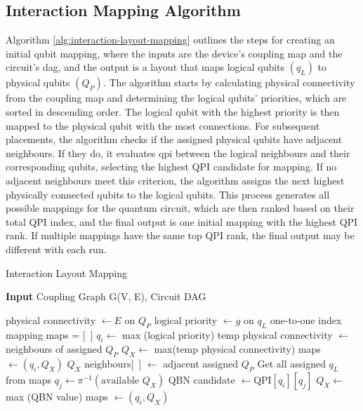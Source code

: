 \subsection{Interaction Mapping Algorithm}
Algorithm \ref{alg:interaction-layout-mapping}  outlines the steps for creating an initial qubit mapping, where the inputs are the device's coupling map and the circuit's \acrfull{dag}, and the output is a layout that maps logical qubits $(q_L)$ to physical qubits $(Q_P)$. The algorithm starts by calculating physical connectivity from the coupling map and determining the logical qubits' priorities, which are sorted in descending order. The logical qubit with the highest priority is then mapped to the physical qubit with the most connections. For subsequent placements, the algorithm checks if the assigned physical qubits have adjacent neighbours. If they do, it evaluates \acrfull{qpi} between the logical neighbours and their corresponding qubits, selecting the highest QPI candidate for mapping. If no adjacent neighbours meet this criterion, the algorithm assigns the next highest physically connected qubits to the logical qubits. This process generates all possible mappings for the quantum circuit, which are then ranked based on their total QPI index, and the final output is one initial mapping with the highest QPI rank. If multiple mappings have the same top QPI rank, the final output may be different with each run.

\begin{algorithm}[htb]
\caption{Interaction Layout Mapping}\label{alg:interaction-layout-mapping}
\hspace*{\algorithmicindent} \textbf{Input} Coupling Graph G(V, E), Circuit DAG \\
\begin{algorithmic}[1]
\State physical connectivity $\gets E$ on $Q_P$
\State logical priority $\gets g$ on $q_L$
\State \Return one-to-one index mapping
\EndIf
\State maps = [\ ]
        \State $q_i \gets$ max (logical priority)
        \State temp physical connectivity $\gets$ neighbours of assigned $Q_P$
            \State $Q_X \gets$ max(temp physical connectivity)
            \State maps $\gets (q_i, Q_X)$
        \Else
            \State $Q_X$ neighbours[\ ] $\gets$ adjacent assigned $Q_P$
            \State Get all assigned $q_L$ from maps
                \State $q_j \gets \pi^{-1}(\text{available }Q_X)$
                \State QBN candidate $\gets \text{QPI}[q_i][q_j]$
            \EndFor
            \State $Q_X \gets$ max (QBN value)
            \State maps $\gets (q_i, Q_X)$
        \EndIf
    \EndFor
\EndWhile
\end{algorithmic}
\end{algorithm}

